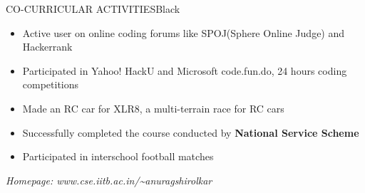 \documentclass[11pt,a4paper]{article} %
\begin{document}
\begin{ressection}{CO-CURRICULAR ACTIVITIES}{Black}

\begin{itemize}
\itemsep-0.3em
\item Active user on online coding forums like SPOJ(Sphere Online Judge) and Hackerrank
\item Participated in Yahoo! HackU and Microsoft code.fun.do, 24 hours coding competitions
\item Made an RC car for XLR8, a multi-terrain race for RC cars
\item Successfully completed the course conducted by \textbf{National Service Scheme}
\item Participated in interschool football matches
\end{itemize}
  
\end{ressection}

\vspace{4mm}
\noindent \textit{Homepage: www.cse.iitb.ac.in/\textasciitilde anuragshirolkar}
\end{document}
